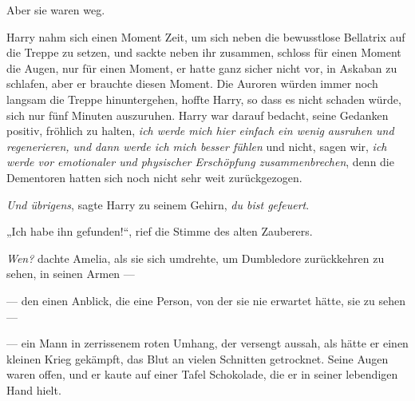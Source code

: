 Aber sie waren weg.

Harry nahm sich einen Moment Zeit, um sich neben die bewusstlose Bellatrix auf die Treppe zu setzen, und sackte neben ihr zusammen, schloss für einen Moment die Augen, nur für einen Moment, er hatte ganz sicher nicht vor, in Askaban zu schlafen, aber er brauchte diesen Moment. Die Auroren würden immer noch langsam die Treppe hinuntergehen, hoffte Harry, so dass es nicht schaden würde, sich nur fünf Minuten auszuruhen. Harry war darauf bedacht, seine Gedanken positiv, fröhlich zu halten, \emph{ich werde mich hier einfach ein wenig} \emph{ausruhen und} \emph{regenerieren, und dann werde ich mich besser fühlen} und nicht, sagen wir, \emph{ich werde vor emotionaler und physischer Erschöpfung zusammenbrechen}, denn die Dementoren hatten sich noch nicht sehr weit zurückgezogen.

\emph{Und übrigens}, sagte Harry zu seinem Gehirn, \emph{du bist gefeuert}.

\later

„Ich habe ihn gefunden!“, rief die Stimme des alten Zauberers.

\emph{Wen?} dachte Amelia, als sie sich umdrehte, um Dumbledore zurückkehren zu sehen, in seinen Armen —

— den einen Anblick, die eine Person, von der sie nie erwartet hätte, sie zu sehen —

— ein Mann in zerrissenem roten Umhang, der versengt aussah, als hätte er einen kleinen Krieg gekämpft, das Blut an vielen Schnitten getrocknet. Seine Augen waren offen, und er kaute auf einer Tafel Schokolade, die er in seiner lebendigen Hand hielt.

